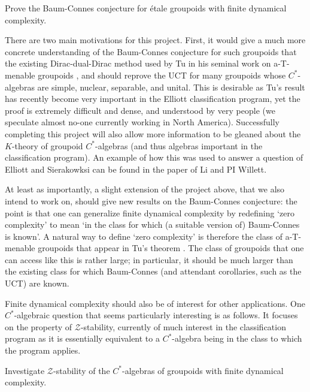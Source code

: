 \begin{project}
Prove the Baum-Connes conjecture for \'{e}tale groupoids with finite dynamical complexity.
\end{project} 

There are two main motivations for this project.  First, it would give a much more concrete understanding of the Baum-Connes conjecture for such groupoids that the existing Dirac-dual-Dirac method used by Tu in his seminal work on a-T-menable groupoids \cite{Tu:1999bq}, and should reprove the UCT for many  groupoids whose $C^*$-algebras are simple, nuclear, separable, and unital.  This is desirable as Tu's result has recently become very important in the Elliott classification program, yet the proof is extremely difficult and dense, and understood by very people (we speculate almost no-one currently working in North America). Successfully completing this project will also allow more information to be gleaned about the $K$-theory of groupoid $C^*$-algebras (and thus algebras important in the classification program).  An example of how this was used to answer a question of Elliott and Sierakowksi can be found in the paper \cite{Li:2017ac} of Li and PI Willett.

At least as importantly, a slight extension of the project above, that we also intend to work on, should give new results on the Baum-Connes conjecture: the point is that one can generalize finite dynamical complexity by redefining `zero complexity' to mean `in the class for which (a suitable version of) Baum-Connes is known'.  A natural way to define `zero complexity' is therefore the class of a-T-menable groupoids that appear in Tu's theorem \cite{Tu:1999bq}.  The class of groupoids that one can access like this is rather large; in particular, it should be much larger than the existing class for which Baum-Connes (and attendant corollaries, such as the UCT) are known.

Finite dynamical complexity should also be of interest for other applications.  One $C^*$-algebraic question that seems particularly interesting is as follows.  It focuses on the property of $\mathcal{Z}$-stability, currently of much interest in the classification program as it is essentially equivalent to a $C^*$-algebra being in the class to which the program applies.

\begin{project}\label{z stable proj}
Investigate $\mathcal{Z}$-stability of the $C^*$-algebras of groupoids with finite dynamical complexity.
\end{project}

